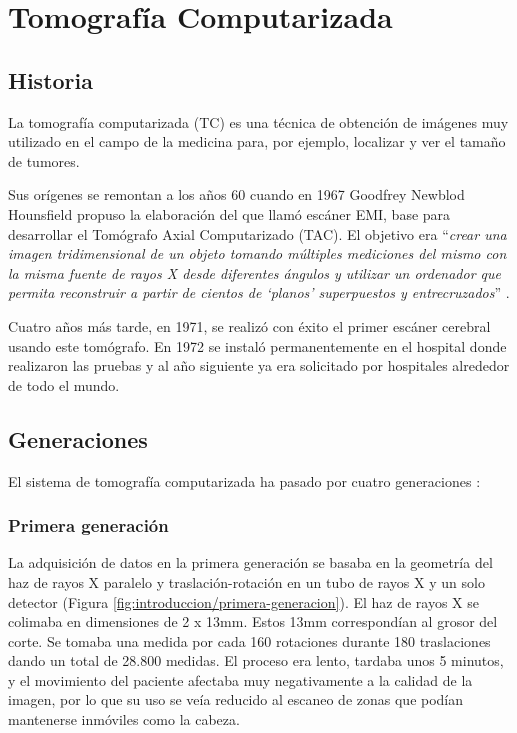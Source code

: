 \section{Tomografía Computarizada}

\subsection{Historia}

La tomografía computarizada (TC) es una técnica de obtención de imágenes muy utilizado en el campo de la medicina para, por ejemplo, localizar y ver el tamaño de tumores.

Sus orígenes se remontan a los años 60 cuando en 1967 Goodfrey Newblod Hounsfield propuso la elaboración del que llamó escáner EMI, base para desarrollar el Tomógrafo Axial Computarizado (TAC). El objetivo era ``\textit{crear una imagen tridimensional de un objeto tomando múltiples mediciones del mismo con la misma fuente de rayos X desde diferentes ángulos y utilizar un ordenador que permita reconstruir a partir de cientos de `planos' superpuestos y entrecruzados}'' \cite{manual-tomografia}.

Cuatro años más tarde, en 1971, se realizó con éxito el primer escáner cerebral usando este tomógrafo. En 1972 se instaló permanentemente en el hospital donde realizaron las pruebas y al año siguiente ya era solicitado por hospitales alrededor de todo el mundo.

\subsection{Generaciones}

El sistema de tomografía computarizada ha pasado por cuatro generaciones \cite{tc-esculturas}:

\subsubsection{Primera generación}

La adquisición de datos en la primera generación se basaba en la geometría del haz de rayos X paralelo y traslación-rotación en un tubo de rayos X y un solo detector (Figura \ref{fig:introduccion/primera-generacion}). El haz de rayos X se colimaba en dimensiones de 2 x 13mm. Estos 13mm correspondían al grosor del corte. Se tomaba una medida por cada 160 rotaciones durante 180 traslaciones dando un total de 28.800 medidas. El proceso era lento, tardaba unos 5 minutos, y el movimiento del paciente afectaba muy negativamente a la calidad de la imagen, por lo que su uso se veía reducido al escaneo de zonas que podían mantenerse inmóviles como la cabeza.


